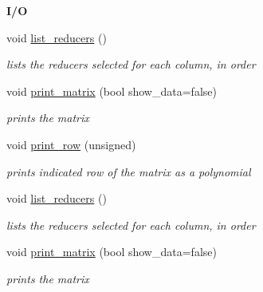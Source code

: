 \begin{Indent}\textbf{ I/O}\par
\begin{DoxyCompactItemize}
\item 
\mbox{\label{group___g_b_computation_af4491ffa78cb0e75051492b83f51744b}} 
void \hyperlink{group___g_b_computation_af4491ffa78cb0e75051492b83f51744b}{list\+\_\+reducers} ()
\begin{DoxyCompactList}\small\item\em lists the reducers selected for each column, in order \end{DoxyCompactList}\item 
void \hyperlink{group___g_b_computation_a9f3e9b5617084c34f97acd23d6e67a43}{print\+\_\+matrix} (bool show\+\_\+data=false)
\begin{DoxyCompactList}\small\item\em prints the matrix \end{DoxyCompactList}\item 
\mbox{\label{group___g_b_computation_a11e756a43276426735929d09976d7337}} 
void \hyperlink{group___g_b_computation_a11e756a43276426735929d09976d7337}{print\+\_\+row} (unsigned)
\begin{DoxyCompactList}\small\item\em prints indicated row of the matrix as a polynomial \end{DoxyCompactList}\item 
\mbox{\label{group___g_b_computation_af4491ffa78cb0e75051492b83f51744b}} 
void \hyperlink{group___g_b_computation_af4491ffa78cb0e75051492b83f51744b}{list\+\_\+reducers} ()
\begin{DoxyCompactList}\small\item\em lists the reducers selected for each column, in order \end{DoxyCompactList}\item 
void \hyperlink{group___g_b_computation_a9f3e9b5617084c34f97acd23d6e67a43}{print\+\_\+matrix} (bool show\+\_\+data=false)
\begin{DoxyCompactList}\small\item\em prints the matrix \end{DoxyCompactList}\end{DoxyCompactItemize}
\end{Indent}
